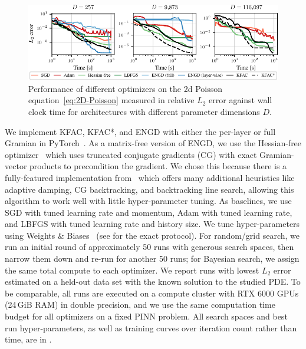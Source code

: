 \begin{figure}[t]
  \centering
  \includegraphics{../kfac_pinns_exp/exp17_groupplot_poisson2d/l2_error_over_time.pdf}
  \caption{Performance of different optimizers on the 2d Poisson equation~\eqref{eq:2D-Poisson} measured in relative $L_2$ error against wall clock time for architectures with different parameter dimensions $D$.}
  \label{fig:2D-Poisson}
\end{figure}

We implement KFAC, KFAC*, and ENGD with either the per-layer or full Gramian in PyTorch~\citep{paszke2019pytorch}.
As a matrix-free version of ENGD, we use the Hessian-free optimizer~\citep{martens2010deep} which uses truncated conjugate gradients (CG) with exact Gramian-vector products to precondition the gradient.
We chose this because there is a fully-featured implementation from~\citet{tatzel2022late} which offers many additional heuristics like adaptive damping, CG backtracking, and backtracking line search, allowing this algorithm to work well with little hyper-parameter tuning.
As baselines, we use SGD with tuned learning rate and momentum, Adam with tuned learning rate, and LBFGS with tuned learning rate and history size.
We tune hyper-parameters using Weights \& Biases~\citep{wandb} (see  for the exact protocol).
For random/grid search, we run an initial round of approximately 50 runs with generous search spaces, then narrow them down and re-run for another 50 runs; for Bayesian search, we assign the same total compute to each optimizer.
We report runs with lowest $L_2$ error estimated on a held-out data set with the known solution to the studied PDE.
To be comparable, all runs are executed on a compute cluster with RTX 6000 GPUs (24\,GiB RAM) in double precision, and we use the same computation time budget for all optimizers on a fixed PINN problem.
All search spaces and best run hyper-parameters, as well as training curves over iteration count rather than time, are in .

